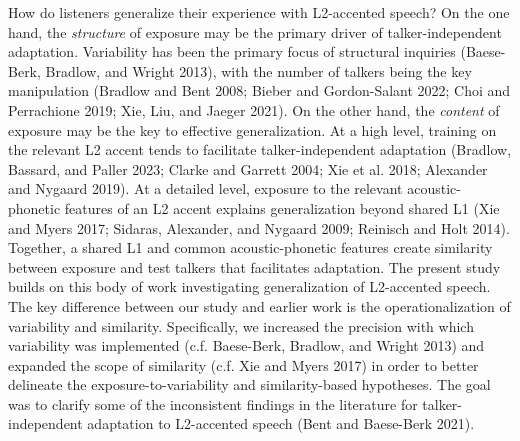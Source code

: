 \documentclass[
  preprint]{elsarticle}
\begin{document}
How do listeners generalize their experience with L2-accented speech?
On the one hand, the \emph{structure} of exposure may be the primary driver of talker-independent adaptation.
Variability has been the primary focus of structural inquiries (Baese-Berk, Bradlow, and Wright 2013), with the number of talkers being the key manipulation (Bradlow and Bent 2008; Bieber and Gordon-Salant 2022; Choi and Perrachione 2019; Xie, Liu, and Jaeger 2021).
On the other hand, the \emph{content} of exposure may be the key to effective generalization.
At a high level, training on the relevant L2 accent tends to facilitate talker-independent adaptation (Bradlow, Bassard, and Paller 2023; Clarke and Garrett 2004; Xie et al. 2018; Alexander and Nygaard 2019).
At a detailed level, exposure to the relevant acoustic-phonetic features of an L2 accent explains generalization beyond shared L1 (Xie and Myers 2017; Sidaras, Alexander, and Nygaard 2009; Reinisch and Holt 2014).
Together, a shared L1 and common acoustic-phonetic features create similarity between exposure and test talkers that facilitates adaptation.
The present study builds on this body of work investigating generalization of L2-accented speech.
The key difference between our study and earlier work is the operationalization of variability and similarity.
Specifically, we increased the precision with which variability was implemented (c.f. Baese-Berk, Bradlow, and Wright 2013) and expanded the scope of similarity (c.f. Xie and Myers 2017) in order to better delineate the exposure-to-variability and similarity-based hypotheses.
The goal was to clarify some of the inconsistent findings in the literature for talker-independent adaptation to L2-accented speech (Bent and Baese-Berk 2021).
\end{document}
